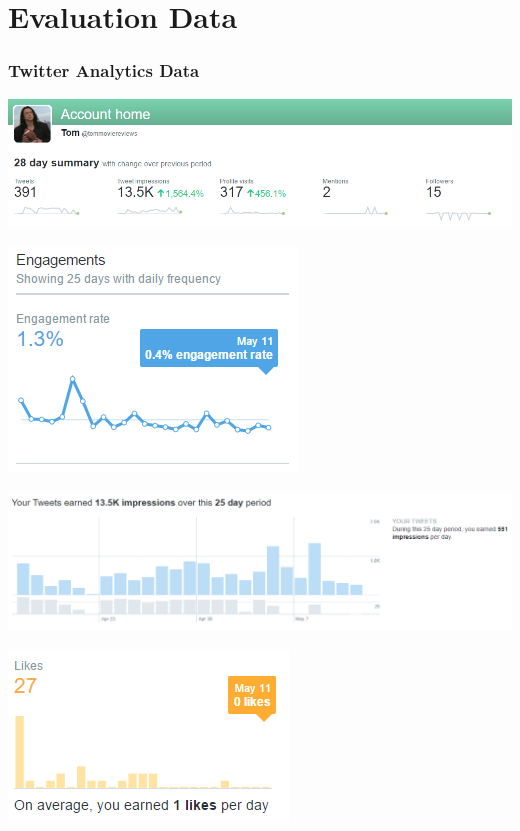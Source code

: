 


\chapter{Evaluation Data}
\subsection{Twitter Analytics Data}



\centering
\includegraphics[width=0.7\linewidth]{figures/twitter_analytics/28daysummary}
\label{fig:28daysummary}


\centering
\includegraphics[width=0.7\linewidth]{figures/twitter_analytics/engagements}
\label{fig:engagements}


\centering
\includegraphics[width=0.7\linewidth]{figures/twitter_analytics/impressions}
\label{fig:impressions}


\centering
\includegraphics[width=0.7\linewidth]{figures/twitter_analytics/likes}
\label{fig:likes}

